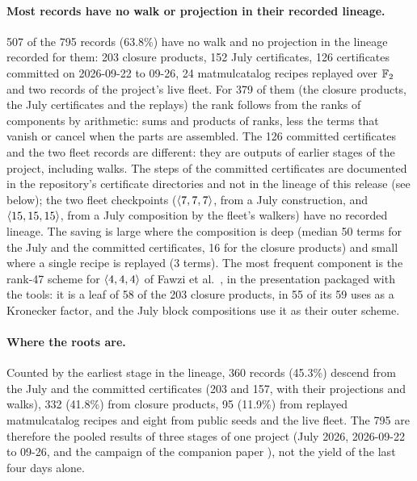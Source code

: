 \paragraph{Most records have no walk or projection in their recorded lineage.}
507 of the 795 records (63.8\%) have no walk and no projection in the lineage recorded for them: 203 closure products, 152 July certificates, 126 certificates committed on 2026-09-22 to 09-26, 24 matmulcatalog recipes replayed over ${\mathbb{F}_2}$ and two records of the project's live fleet.
For 379 of them (the closure products, the July certificates and the replays) the rank follows from the ranks of components by arithmetic: sums and products of ranks, less the terms that vanish or cancel when the parts are assembled.
The 126 committed certificates and the two fleet records are different: they are outputs of earlier stages of the project, including walks. The steps of the committed certificates are documented in the repository's certificate directories and not in the lineage of this release (see below); the two fleet checkpoints ($\langle 7,7,7\rangle$, from a July construction, and $\langle 15,15,15\rangle$, from a July composition by the fleet's walkers) have no recorded lineage.
The saving is large where the composition is deep (median 50 terms for the July and the committed certificates, 16 for the closure products) and small where a single recipe is replayed (3 terms).
The most frequent component is the rank-47 scheme for $\langle 4,4,4\rangle$ of Fawzi et al.\ \cite{fawzi2022discovering}, in the presentation packaged with the tools: it is a leaf of 58 of the 203 closure products, in 55 of its 59 uses as a Kronecker factor, and the July block compositions use it as their outer scheme.

\paragraph{Where the roots are.}
Counted by the earliest stage in the lineage, 360 records (45.3\%) descend from the July and the committed certificates (203 and 157, with their projections and walks), 332 (41.8\%) from closure products, 95 (11.9\%) from replayed matmulcatalog recipes and eight from public seeds and the live fleet.
The 795 are therefore the pooled results of three stages of one project (July 2026, 2026-09-22 to 09-26, and the campaign of the companion paper \cite{peterson2026methods}), not the yield of the last four days alone.

